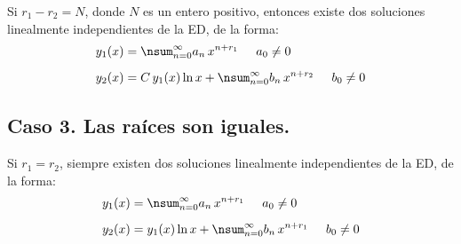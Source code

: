 Si $r_{1} - r_{2} = N$, donde $N$ es un entero positivo, entonces existe dos soluciones linealmente independientes de la ED, de la forma:
\begin{subequations}
\begin{align}
y_{1} (x) &= \nsum_{n=0}^{\infty} a_{n} \, x^{n+r_{1}} \hspace{0.5cm} a_{0} \neq 0 \label{eq:ecuacion_20a} \\[0.5em]
y_{2} (x) &= C \, y_{1} (x) \ln x + \nsum_{n=0}^{\infty} b_{n} \, x^{n+r_{2}} \hspace{0.5cm} b_{0} \neq 0 \label{eq:ecuacion_20b}
\end{align}
\end{subequations}

\subsection*{Caso 3. Las raíces son iguales.}

Si $r_{1} = r_{2}$, siempre existen dos soluciones linealmente independientes de la ED, de la forma:
\begin{subequations}
\begin{align}
y_{1} (x) &= \nsum_{n=0}^{\infty} a_{n} \, x^{n+r_{1}} \hspace{0.5cm} a_{0} \neq 0 \label{eq:ecuacion_21a} \\[0.5em]
y_{2} (x) &= y_{1} (x) \ln x + \nsum_{n=0}^{\infty} b_{n} \, x^{n+r_{1}} \hspace{0.5cm} b_{0} \neq 0 \label{eq:ecuacion_21b}
\end{align}
\end{subequations}



